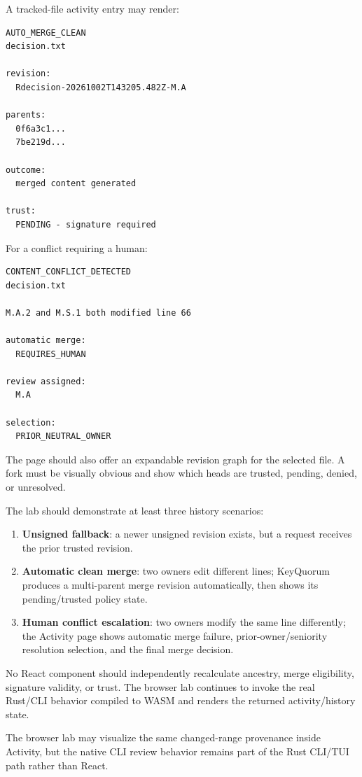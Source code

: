 \documentclass[11pt]{article}
\begin{document}
A tracked-file activity entry may render:

\begin{lstlisting}
AUTO_MERGE_CLEAN
decision.txt

revision:
  Rdecision-20261002T143205.482Z-M.A

parents:
  0f6a3c1...
  7be219d...

outcome:
  merged content generated

trust:
  PENDING - signature required
\end{lstlisting}

For a conflict requiring a human:

\begin{lstlisting}
CONTENT_CONFLICT_DETECTED
decision.txt

M.A.2 and M.S.1 both modified line 66

automatic merge:
  REQUIRES_HUMAN

review assigned:
  M.A

selection:
  PRIOR_NEUTRAL_OWNER
\end{lstlisting}

The page should also offer an expandable revision graph for the selected file. A fork must be visually obvious and show which heads are trusted, pending, denied, or unresolved.

The lab should demonstrate at least three history scenarios:

\begin{enumerate}[leftmargin=1.8em]
  \item \textbf{Unsigned fallback}: a newer unsigned revision exists, but a request receives the prior trusted revision.
  \item \textbf{Automatic clean merge}: two owners edit different lines; KeyQuorum produces a multi-parent merge revision automatically, then shows its pending/trusted policy state.
  \item \textbf{Human conflict escalation}: two owners modify the same line differently; the Activity page shows automatic merge failure, prior-owner/seniority resolution selection, and the final merge decision.
\end{enumerate}

No React component should independently recalculate ancestry, merge eligibility, signature validity, or trust. The browser lab continues to invoke the real Rust/CLI behavior compiled to WASM and renders the returned activity/history state.

The browser lab may visualize the same changed-range provenance inside Activity, but the native CLI review behavior remains part of the Rust CLI/TUI path rather than React.
\end{document}
